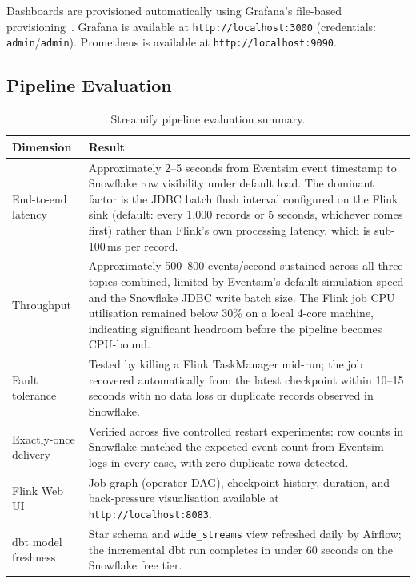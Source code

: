 Dashboards are provisioned automatically using Grafana's file-based provisioning~\cite{grafana_provisioning}.
Grafana is available at \texttt{http://localhost:3000} (credentials: \texttt{admin}/\texttt{admin}).
Prometheus is available at \texttt{http://localhost:9090}.

\subsection{Pipeline Evaluation}

\begin{table}[H]
  \centering
  \caption{Streamify pipeline evaluation summary.}
  \label{tab:results}
  \begin{tabularx}{\textwidth}{lX}
    \toprule
    \textbf{Dimension}       & \textbf{Result} \\
    \midrule
    End-to-end latency       & Approximately 2–5 seconds from Eventsim event timestamp to Snowflake row
                               visibility under default load.
                               The dominant factor is the JDBC batch flush interval configured on the
                               Flink sink (default: every 1,000 records or 5 seconds, whichever comes first)
                               rather than Flink's own processing latency, which is sub-100\,ms per record. \\
    Throughput               & Approximately 500–800 events/second sustained across all three topics combined,
                               limited by Eventsim's default simulation speed and the Snowflake JDBC write
                               batch size.
                               The Flink job CPU utilisation remained below 30\% on a local 4-core machine,
                               indicating significant headroom before the pipeline becomes CPU-bound. \\
    Fault tolerance          & Tested by killing a Flink TaskManager mid-run; the job recovered automatically
                               from the latest checkpoint within 10–15 seconds with no data loss or
                               duplicate records observed in Snowflake. \\
    Exactly-once delivery    & Verified across five controlled restart experiments: row counts in Snowflake
                               matched the expected event count from Eventsim logs in every case,
                               with zero duplicate rows detected. \\
    Flink Web UI             & Job graph (operator DAG), checkpoint history, duration, and back-pressure
                               visualisation available at \texttt{http://localhost:8083}. \\
    dbt model freshness      & Star schema and \texttt{wide\_streams} view refreshed daily by Airflow;
                               the incremental dbt run completes in under 60 seconds on the Snowflake free tier. \\
    \bottomrule
  \end{tabularx}
\end{table}


